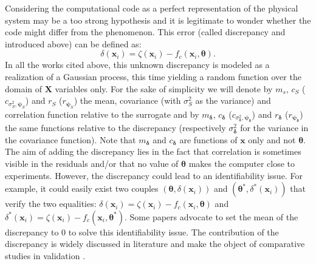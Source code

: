 \documentclass[soumission]{jsfds}
\edef\hc{\string: }
\begin{document}
\noindent Considering the computational code as a perfect representation of the physical system may be a too strong hypothesis and it is legitimate to wonder whether the code might differ from the phenomenon. This error (called discrepancy and introduced above) can be defined as\hc
\begin{equation*}
\delta(\boldsymbol{x}_i)=\zeta(\boldsymbol{x}_i)-f_c(\boldsymbol{x}_i,\boldsymbol{\theta}).
\end{equation*}
In all the works cited above, this unknown discrepancy is modeled as a realization of a Gaussian process, this time yielding a random function over the domain of $\boldsymbol{X}$ variables only. For the sake of simplicity we will denote by $m_s$, $c_S$ ($c_{\sigma_S^2,\boldsymbol{\psi}_S}$) and $r_S$ ($r_{\boldsymbol{\psi}_S}$) the mean, covariance (with $\sigma_S^2$ as the variance) and correlation function relative to the surrogate and by $m_{\boldsymbol{\delta}}$, $c_{\boldsymbol{\delta}}$ ($c_{\sigma_{\boldsymbol{\delta}}^2,\boldsymbol{\psi}_{\boldsymbol{\delta}}}$) and $r_{\boldsymbol{\delta}}$ ($r_{\boldsymbol{\psi}_{\boldsymbol{\delta}}}$) the same functions relative to the discrepancy (respectively $\sigma_{\boldsymbol{\delta}}^2$ for the variance in the covariance function). 
Note that $m_{\boldsymbol{\delta}}$ and $c_{\boldsymbol{\delta}}$ are functions of $\boldsymbol{x}$ only and not $\boldsymbol{\theta}$. The aim of adding the discrepancy lies in the fact that correlation is sometimes visible in the residuals and/or that no value of $\boldsymbol{\theta}$ makes the computer close to experiments. However, the discrepancy could lead to an identifiability issue. For example, it could easily exist two couples $(\boldsymbol{\theta},\delta(\boldsymbol{x}_i))$ and $(\boldsymbol{\theta}^*,\delta^*(\boldsymbol{x}_i))$ that verify the two equalities\hc $\delta(\boldsymbol{x}_i)=\zeta(\boldsymbol{x}_i)-f_c(\boldsymbol{x}_i,\boldsymbol{\theta})$ and $\delta^*(\boldsymbol{x}_i)=\zeta(\boldsymbol{x}_i)-f_c(\boldsymbol{x}_i,\boldsymbol{\theta}^*)$. Some papers \citep{higdon2004,bachoc2014,bayarri2007} advocate to set the mean of the discrepancy to 0 to solve this identifiability issue. The contribution of the discrepancy is widely discussed in literature and make the object of comparative studies in validation \citep{damblin2015}. \newline
\end{document}
